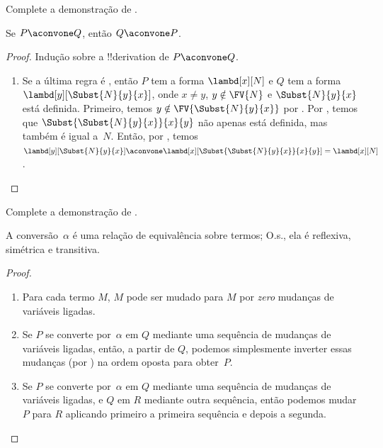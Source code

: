 \documentclass[../../../include/open-logic-section]{subfiles}
\begin{document}
\begin{prob}
  Complete a demonstração de .
\end{prob}

\begin{lem}
  Se $P \aconvone Q$, então $Q \aconvone P$.
\end{lem}

\begin{proof}
  Indução sobre a !!{derivation} de $P \aconvone Q$.
  \begin{enumerate}
  \item Se a última regra é , então $P$ tem a forma
    $\lambd[x][N]$ e $Q$ tem a forma $\lambd[y][\Subst{N}{y}{x}]$, onde
    $x \neq y$, $y \notin \FV{N}$ e $\Subst{N}{y}{x}$ está definida.
    Primeiro, temos $y \notin \FV{\Subst{N}{y}{x}}$ por
    . Por , temos que
    $\Subst{\Subst{N}{y}{x}}{x}{y}$ não apenas está definida, mas também é
    igual a~$N$. Então, por , temos
    $\lambd[y][\Subst{N}{y}{x}] \aconvone
    \lambd[x][\Subst{\Subst{N}{y}{x}}{x}{y}] = \lambd[x][N]$.
  \end{enumerate}
\end{proof}

\begin{prob}
  Complete a demonstração de .
\end{prob}

\begin{thm}
  A conversão~$\alpha$ é uma relação de equivalência sobre termos; O.s.\@,
  ela é reflexiva, simétrica e transitiva.
\end{thm}

\begin{proof}
  \begin{enumerate}
  \item Para cada termo $M$, $M$ pode ser mudado para $M$ por
    \emph{zero} mudanças de variáveis ligadas.
  \item Se $P$ se converte por~$\alpha$ em $Q$ mediante uma sequência de
    mudanças de variáveis ligadas, então, a partir de $Q$, podemos simplesmente
    inverter essas mudanças (por ) na ordem oposta para
    obter~$P$.
  \item Se $P$ se converte por~$\alpha$ em $Q$ mediante uma sequência de
    mudanças de variáveis ligadas, e $Q$ em $R$ mediante outra sequência,
    então podemos mudar $P$ para $R$ aplicando primeiro a primeira sequência e
    depois a segunda.
  \end{enumerate}
\end{proof}
\end{document}
